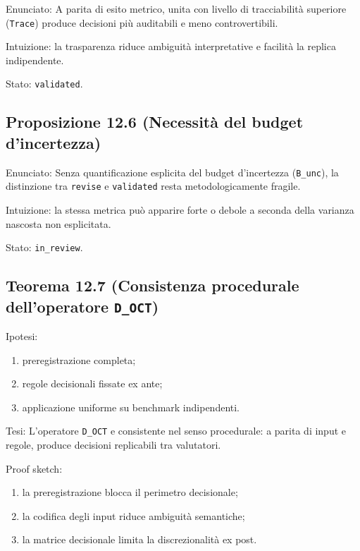 Enunciato:
A parita di esito metrico, unita con livello di tracciabilità superiore (\texttt{Trace}) produce decisioni più auditabili e meno controvertibili.

Intuizione:
la trasparenza riduce ambiguità interpretative e facilità la replica indipendente.

Stato: \texttt{validated}.

\subsection{Proposizione 12.6 (Necessità del budget d'incertezza)}

Enunciato:
Senza quantificazione esplicita del budget d'incertezza (\texttt{B\_unc}), la distinzione tra \texttt{revise} e \texttt{validated} resta metodologicamente fragile.

Intuizione:
la stessa metrica può apparire forte o debole a seconda della varianza nascosta non esplicitata.

Stato: \texttt{in\_review}.

\subsection{\texorpdfstring{Teorema 12.7 (Consistenza procedurale dell'operatore \texttt{D\_OCT})}{Teorema 12.7 (Consistenza procedurale dell'operatore D\_OCT)}}

Ipotesi:

\begin{enumerate}
\def\labelenumi{\arabic{enumi}.}
\tightlist
\item
  preregistrazione completa;
\item
  regole decisionali fissate ex ante;
\item
  applicazione uniforme su benchmark indipendenti.
\end{enumerate}

Tesi:
L'operatore \texttt{D\_OCT} e consistente nel senso procedurale: a parita di input e regole, produce decisioni replicabili tra valutatori.

Proof sketch:

\begin{enumerate}
\def\labelenumi{\arabic{enumi}.}
\tightlist
\item
  la preregistrazione blocca il perimetro decisionale;
\item
  la codifica degli input riduce ambiguità semantiche;
\item
  la matrice decisionale limita la discrezionalità ex post.
\end{enumerate}

